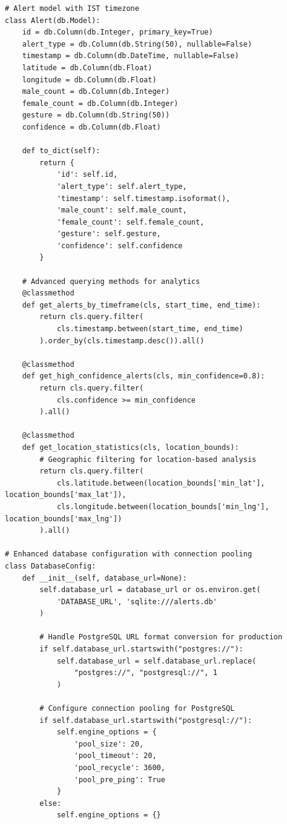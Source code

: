 \documentclass[12pt,a4paper]{article}
\begin{document}
\begin{lstlisting}
# Alert model with IST timezone
class Alert(db.Model):
    id = db.Column(db.Integer, primary_key=True)
    alert_type = db.Column(db.String(50), nullable=False)
    timestamp = db.Column(db.DateTime, nullable=False)
    latitude = db.Column(db.Float)
    longitude = db.Column(db.Float)
    male_count = db.Column(db.Integer)
    female_count = db.Column(db.Integer)
    gesture = db.Column(db.String(50))
    confidence = db.Column(db.Float)
    
    def to_dict(self):
        return {
            'id': self.id,
            'alert_type': self.alert_type,
            'timestamp': self.timestamp.isoformat(),
            'male_count': self.male_count,
            'female_count': self.female_count,
            'gesture': self.gesture,
            'confidence': self.confidence
        }

    # Advanced querying methods for analytics
    @classmethod
    def get_alerts_by_timeframe(cls, start_time, end_time):
        return cls.query.filter(
            cls.timestamp.between(start_time, end_time)
        ).order_by(cls.timestamp.desc()).all()
    
    @classmethod
    def get_high_confidence_alerts(cls, min_confidence=0.8):
        return cls.query.filter(
            cls.confidence >= min_confidence
        ).all()
    
    @classmethod
    def get_location_statistics(cls, location_bounds):
        # Geographic filtering for location-based analysis
        return cls.query.filter(
            cls.latitude.between(location_bounds['min_lat'], location_bounds['max_lat']),
            cls.longitude.between(location_bounds['min_lng'], location_bounds['max_lng'])
        ).all()

# Enhanced database configuration with connection pooling
class DatabaseConfig:
    def __init__(self, database_url=None):
        self.database_url = database_url or os.environ.get(
            'DATABASE_URL', 'sqlite:///alerts.db'
        )
        
        # Handle PostgreSQL URL format conversion for production
        if self.database_url.startswith("postgres://"):
            self.database_url = self.database_url.replace(
                "postgres://", "postgresql://", 1
            )
        
        # Configure connection pooling for PostgreSQL
        if self.database_url.startswith("postgresql://"):
            self.engine_options = {
                'pool_size': 20,
                'pool_timeout': 20,
                'pool_recycle': 3600,
                'pool_pre_ping': True
            }
        else:
            self.engine_options = {}


\end{lstlisting}
\end{document}

